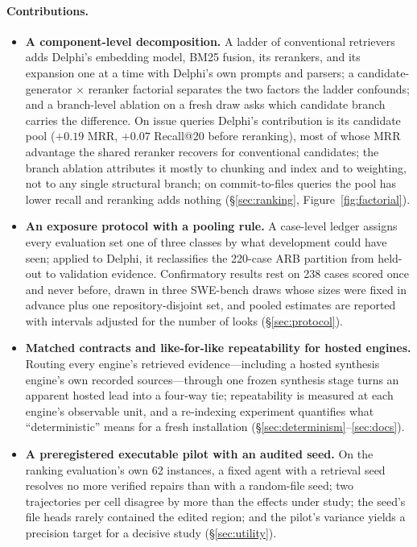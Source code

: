 \documentclass{article}
\newcommand{\system}{Delphi}
\begin{document}
\paragraph{Contributions.}
\begin{itemize}[leftmargin=1.2em]
    \item \textbf{A component-level decomposition.} A ladder of conventional retrievers adds \system{}'s embedding model, BM25 fusion, its rerankers, and its expansion one at a time with \system{}'s own prompts and parsers; a candidate-generator $\times$ reranker factorial separates the two factors the ladder confounds; and a branch-level ablation on a fresh draw asks which candidate branch carries the difference. On issue queries \system{}'s contribution is its candidate pool ($+0.19$ MRR, $+0.07$ Recall@20 before reranking), most of whose MRR advantage the shared reranker recovers for conventional candidates; the branch ablation attributes it mostly to chunking and index and to weighting, not to any single structural branch; on commit-to-files queries the pool has lower recall and reranking adds nothing (\S\ref{sec:ranking}, Figure~\ref{fig:factorial}).
    \item \textbf{An exposure protocol with a pooling rule.} A case-level ledger assigns every evaluation set one of three classes by what development could have seen; applied to \system{}, it reclassifies the 220-case ARB partition from held-out to validation evidence. Confirmatory results rest on 238 cases scored once and never before, drawn in three SWE-bench draws whose sizes were fixed in advance plus one repository-disjoint set, and pooled estimates are reported with intervals adjusted for the number of looks (\S\ref{sec:protocol}).
    \item \textbf{Matched contracts and like-for-like repeatability for hosted engines.} Routing every engine's retrieved evidence---including a hosted synthesis engine's own recorded sources---through one frozen synthesis stage turns an apparent hosted lead into a four-way tie; repeatability is measured at each engine's observable unit, and a re-indexing experiment quantifies what ``deterministic'' means for a fresh installation (\S\ref{sec:determinism}--\ref{sec:docs}).
    \item \textbf{A preregistered executable pilot with an audited seed.} On the ranking evaluation's own 62 instances, a fixed agent with a retrieval seed resolves no more verified repairs than with a random-file seed; two trajectories per cell disagree by more than the effects under study; the seed's file heads rarely contained the edited region; and the pilot's variance yields a precision target for a decisive study (\S\ref{sec:utility}).
\end{itemize}
\end{document}
